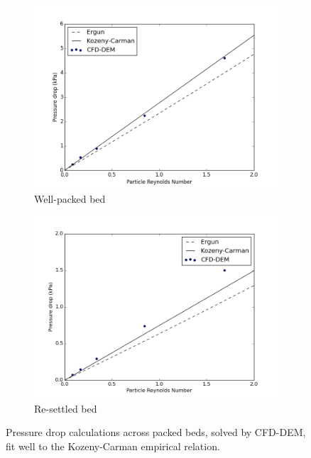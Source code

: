 \begin{figure}
        \centering
        \begin{subfigure}[b]{0.7\textwidth}
                \includegraphics[width=\textwidth]{figures/pressureDrops-full.png}
                \caption{Well-packed bed}
                \label{fig:pressure-drop-full}
        \end{subfigure}%
        
        \begin{subfigure}[b]{0.7\textwidth}
                \includegraphics[width=\textwidth]{figures/pressureDrops-evap.png}
                \caption{Re-settled bed}
                \label{fig:pressure-drop-evap}
        \end{subfigure}
        \caption{Pressure drop calculations across packed beds, solved by CFD-DEM, fit well to the Kozeny-Carman empirical relation.}\label{fig:cfdem-pressure-drop}
\end{figure}


